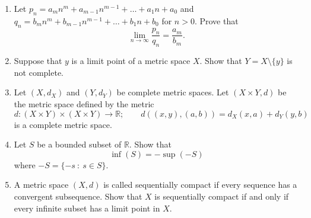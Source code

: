 \documentclass[12pt,letterpaper]{article}
\theoremstyle{plain}
\theoremstyle{definition}
\begin{document}
\begin{enumerate}[1.]
 \item Let $p_n=a_m n^m + a_{m-1}n^{m-1}+\ldots +a_1 n +a_0$ and $q_n=b_m n^m + b_{m-1}n^{m-1}+\ldots +b_1 n +b_0$ for $n>0$. Prove that 
 \[\lim_{n\rightarrow \infty} \frac{p_n}{q_n}= \frac{a_m}{b_m}.\]
 \item Suppose that $y$ is a limit point of a metric space $X$. Show that $Y=X\setminus\{y\}$ is not complete. 
 \item Let $(X,d_X)$ and $(Y,d_Y)$ be complete metric spaces. Let $(X\times Y, d)$ be the metric space defined by the metric 
 \[d:(X\times Y)\times (X\times Y)\rightarrow \mathbb{R};\quad \quad d((x,y),(a,b))=d_X(x,a)+d_Y(y,b)\]
 is a complete metric space. 
 \item Let $S$ be a bounded subset of $\mathbb{R}$. Show that \[\inf(S)=-\sup(-S)\] where $-S=\{-s\ :\ s\in S\}$. 
 \item A  metric space $(X,d)$ is called sequentially compact if every sequence has a convergent subsequence. Show that $X$ is sequentially compact if and only if every infinite subset has a limit point in $X$. 
\end{enumerate}
\end{document}
